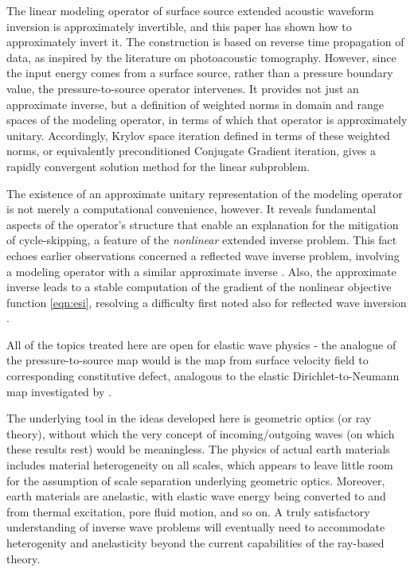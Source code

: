 \documentclass[georeport,12pt]{geophysics}
\begin{document}
The linear modeling operator of surface source extended acoustic
waveform inversion is approximately invertible, and this paper has
shown how to approximately invert it. The construction is based on
reverse time propagation of data, as inspired by the literature on
photoacoustic tomography. However, since the input energy comes from a
surface source, rather than a pressure boundary value, the
pressure-to-source operator intervenes. It provides not just an
approximate inverse, but a definition of weighted norms in domain and
range spaces of the modeling operator, in terms of which that operator
is approximately unitary. Accordingly, Krylov space iteration defined
in terms of these weighted norms, or equivalently preconditioned
Conjugate Gradient iteration, gives a rapidly convergent solution
method for the linear subproblem.

The existence of an approximate unitary representation of the modeling
operator is not merely a computational convenience, however. It
reveals fundamental aspects of the operator's structure that enable
an explanation for the mitigation of cycle-skipping, a feature of the
{\em nonlinear} extended inverse problem. This fact echoes earlier observations
concerned a reflected wave inverse problem, involving a modeling
operator with a similar approximate inverse
\cite[]{tenKroode:IPTA14,Symes:IPTA14}. Also, the approximate inverse
leads to a stable computation of the gradient of the nonlinear
objective function \ref{eqn:esi}, resolving a difficulty first noted
also for reflected wave inversion \cite[]{KerSy:94}.

All of the topics
treated here are open for elastic wave physics - the analogue of the
pressure-to-source map would is the map from surface velocity field to
corresponding constitutive defect, analogous to the elastic
Dirichlet-to-Neumann map investigated by \cite{Rachele:00}.

The underlying tool in the ideas developed here is geometric optics
(or ray theory), without which the very concept of incoming/outgoing waves
(on which these results rest) would be meaningless. The physics of actual earth materials includes
material heterogeneity on all scales, which appears to leave little
room for the assumption of scale separation underlying geometric
optics. Moreover, earth materials are anelastic, with elastic wave
energy being converted to and from thermal excitation, pore fluid
motion, and so on. A truly satisfactory understanding of inverse wave
problems will eventually need to accommodate heterogenity and
anelasticity beyond the current capabilities of the ray-based theory.
\end{document}
